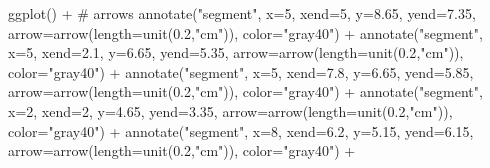 \documentclass[
  12pt,
  letterpaper,
]{book}
\newenvironment{Shaded}{\begin{snugshade}}{\end{snugshade}}
\newcommand{\AttributeTok}[1]{\textcolor[rgb]{0.40,0.45,0.13}{#1}}
\newcommand{\CommentTok}[1]{\textcolor[rgb]{0.37,0.37,0.37}{#1}}
\newcommand{\DecValTok}[1]{\textcolor[rgb]{0.68,0.00,0.00}{#1}}
\newcommand{\FloatTok}[1]{\textcolor[rgb]{0.68,0.00,0.00}{#1}}
\newcommand{\FunctionTok}[1]{\textcolor[rgb]{0.28,0.35,0.67}{#1}}
\newcommand{\NormalTok}[1]{\textcolor[rgb]{0.00,0.23,0.31}{#1}}
\newcommand{\SpecialCharTok}[1]{\textcolor[rgb]{0.37,0.37,0.37}{#1}}
\newcommand{\StringTok}[1]{\textcolor[rgb]{0.13,0.47,0.30}{#1}}
\begin{document}
\begin{Shaded}
\begin{Highlighting}[]
\FunctionTok{ggplot}\NormalTok{() }\SpecialCharTok{+}
  \CommentTok{\# arrows}
  \FunctionTok{annotate}\NormalTok{(}\StringTok{"segment"}\NormalTok{, }\AttributeTok{x=}\DecValTok{5}\NormalTok{, }\AttributeTok{xend=}\DecValTok{5}\NormalTok{, }\AttributeTok{y=}\FloatTok{8.65}\NormalTok{, }\AttributeTok{yend=}\FloatTok{7.35}\NormalTok{,}
           \AttributeTok{arrow=}\FunctionTok{arrow}\NormalTok{(}\AttributeTok{length=}\FunctionTok{unit}\NormalTok{(}\FloatTok{0.2}\NormalTok{,}\StringTok{"cm"}\NormalTok{)), }\AttributeTok{color=}\StringTok{"gray40"}\NormalTok{) }\SpecialCharTok{+}
  \FunctionTok{annotate}\NormalTok{(}\StringTok{"segment"}\NormalTok{, }\AttributeTok{x=}\DecValTok{5}\NormalTok{, }\AttributeTok{xend=}\FloatTok{2.1}\NormalTok{, }\AttributeTok{y=}\FloatTok{6.65}\NormalTok{, }\AttributeTok{yend=}\FloatTok{5.35}\NormalTok{,}
           \AttributeTok{arrow=}\FunctionTok{arrow}\NormalTok{(}\AttributeTok{length=}\FunctionTok{unit}\NormalTok{(}\FloatTok{0.2}\NormalTok{,}\StringTok{"cm"}\NormalTok{)), }\AttributeTok{color=}\StringTok{"gray40"}\NormalTok{) }\SpecialCharTok{+}
  \FunctionTok{annotate}\NormalTok{(}\StringTok{"segment"}\NormalTok{, }\AttributeTok{x=}\DecValTok{5}\NormalTok{, }\AttributeTok{xend=}\FloatTok{7.8}\NormalTok{, }\AttributeTok{y=}\FloatTok{6.65}\NormalTok{, }\AttributeTok{yend=}\FloatTok{5.85}\NormalTok{,}
           \AttributeTok{arrow=}\FunctionTok{arrow}\NormalTok{(}\AttributeTok{length=}\FunctionTok{unit}\NormalTok{(}\FloatTok{0.2}\NormalTok{,}\StringTok{"cm"}\NormalTok{)), }\AttributeTok{color=}\StringTok{"gray40"}\NormalTok{) }\SpecialCharTok{+}
  \FunctionTok{annotate}\NormalTok{(}\StringTok{"segment"}\NormalTok{, }\AttributeTok{x=}\DecValTok{2}\NormalTok{, }\AttributeTok{xend=}\DecValTok{2}\NormalTok{, }\AttributeTok{y=}\FloatTok{4.65}\NormalTok{, }\AttributeTok{yend=}\FloatTok{3.35}\NormalTok{,}
           \AttributeTok{arrow=}\FunctionTok{arrow}\NormalTok{(}\AttributeTok{length=}\FunctionTok{unit}\NormalTok{(}\FloatTok{0.2}\NormalTok{,}\StringTok{"cm"}\NormalTok{)), }\AttributeTok{color=}\StringTok{"gray40"}\NormalTok{) }\SpecialCharTok{+}
  \FunctionTok{annotate}\NormalTok{(}\StringTok{"segment"}\NormalTok{, }\AttributeTok{x=}\DecValTok{8}\NormalTok{, }\AttributeTok{xend=}\FloatTok{6.2}\NormalTok{, }\AttributeTok{y=}\FloatTok{5.15}\NormalTok{, }\AttributeTok{yend=}\FloatTok{6.15}\NormalTok{,}
           \AttributeTok{arrow=}\FunctionTok{arrow}\NormalTok{(}\AttributeTok{length=}\FunctionTok{unit}\NormalTok{(}\FloatTok{0.2}\NormalTok{,}\StringTok{"cm"}\NormalTok{)), }\AttributeTok{color=}\StringTok{"gray40"}\NormalTok{) }\SpecialCharTok{+}

\end{Highlighting}
\end{Shaded}
\end{document}
